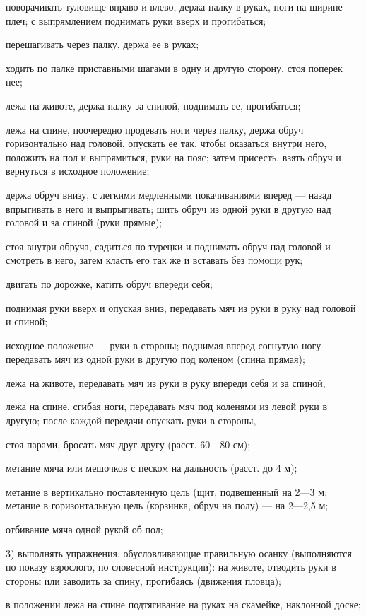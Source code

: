 \documentclass[a5paper]{book}
\begin{document}
поворачивать туловище вправо и влево, держа палку в руках, ноги на
ширине плеч; с выпрямлением поднимать руки вверх и прогибаться;

перешагивать через палку, держа ее в руках;

ходить по палке приставными шагами в одну и другую сторону, стоя поперек
нее;

лежа на животе, держа палку за спиной, поднимать ее, прогибаться;

лежа на спине, поочередно продевать ноги через палку, держа обруч
горизонтально над головой, опускать ее так, чтобы оказаться внутри него,
положить на пол и выпрямиться, руки на пояс; затем присесть, взять обруч
и вернуться в исходное положение;

держа обруч внизу, с легкими медленными покачиваниями вперед --- назад
впрыгивать в него и выпрыгивать; шить обруч из одной руки в другую над
головой и за спиной (руки прямые);

стоя внутри обруча, садиться по-турецки и поднимать обруч над головой и
смотреть в него, затем класть его так же и вставать без \textsc{помощи}
рук;

двигать по дорожке, катить обруч впереди себя;

поднимая руки вверх и опуская вниз, передавать мяч из руки в руку над
головой и спиной;

исходное положение --- руки в стороны; поднимая вперед согнутую ногу
передавать мяч из одной руки в другую под коленом (спина прямая);

лежа на животе, передавать мяч из руки в руку впереди себя и за спиной,

лежа на спине, сгибая ноги, передавать мяч под коленями из левой руки в
другую; после каждой передачи опускать руки в стороны,

стоя парами, бросать мяч друг другу (расст. 60---80 см);

метание мяча или мешочков с песком на дальность (расст. до 4 м);

метание в вертикально поставленную цель (щит, подвешенный на 2---3 м;
метание в горизонтальную цель (корзинка, обруч на полу) --- на 2---2,5
м;

отбивание мяча одной рукой об пол;

3) выполнять упражнения, обусловливающие правильную осанку (выполняются
по показу взрослого, по словесной инструкции): на животе, отводить руки
в стороны или заводить за спину, прогибаясь (движения пловца);

в положении лежа на спине подтягивание на руках на скамейке, наклонной
доске;
\end{document}
